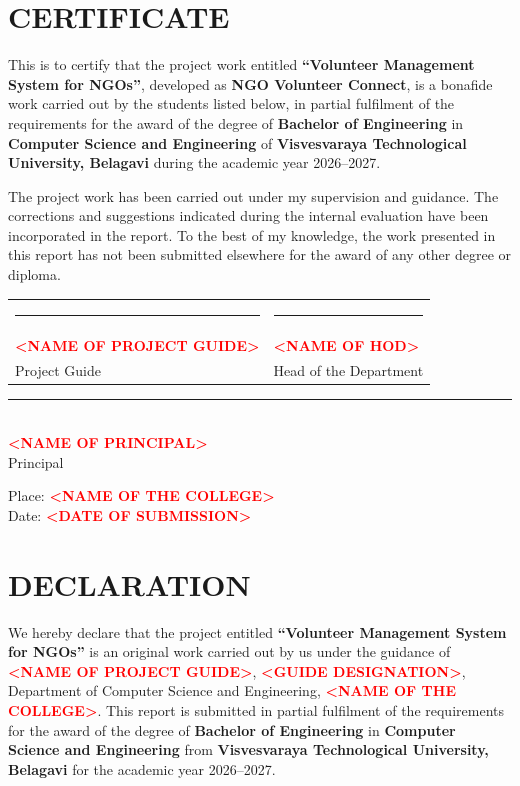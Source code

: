 \documentclass[12pt,a4paper,oneside]{report}
\newcommand{\projecttitle}{Volunteer Management System for NGOs}
\newcommand{\applicationname}{NGO Volunteer Connect}
\newcommand{\college}{\placeholder{NAME OF THE COLLEGE}}
\newcommand{\department}{Department of Computer Science and Engineering}
\newcommand{\university}{Visvesvaraya Technological University, Belagavi}
\newcommand{\academicyear}{2026--2027}
\newcommand{\degree}{Bachelor of Engineering}
\newcommand{\branch}{Computer Science and Engineering}
\newcommand{\guide}{\placeholder{NAME OF PROJECT GUIDE}}
\newcommand{\guideDesignation}{\placeholder{GUIDE DESIGNATION}}
\newcommand{\hod}{\placeholder{NAME OF HOD}}
\newcommand{\principal}{\placeholder{NAME OF PRINCIPAL}}
\newcommand{\placeholder}[1]{\textbf{\textcolor{red}{\textless #1\textgreater}}}
\begin{document}
\chapter*{CERTIFICATE}

This is to certify that the project work entitled \textbf{``\projecttitle''}, developed as \textbf{\applicationname}, is a bonafide work carried out by the students listed below, in partial fulfilment of the requirements for the award of the degree of \textbf{\degree} in \textbf{\branch} of \textbf{\university} during the academic year \academicyear.

The project work has been carried out under my supervision and guidance. The corrections and suggestions indicated during the internal evaluation have been incorporated in the report. To the best of my knowledge, the work presented in this report has not been submitted elsewhere for the award of any other degree or diploma.

\vspace{1.0in}
\noindent
\begin{tabularx}{\textwidth}{X X}
\centering \rule{2.2in}{0.4pt} & \centering \rule{2.2in}{0.4pt}\\
\centering \guide & \centering \hod\\
\centering Project Guide & \centering Head of the Department
\end{tabularx}

\vspace{0.8in}
\begin{center}
\rule{2.5in}{0.4pt}\\
\principal\\
Principal
\end{center}

\vfill
\noindent Place: \college\\
Date: \placeholder{DATE OF SUBMISSION}

\clearpage

\chapter*{DECLARATION}

We hereby declare that the project entitled \textbf{``\projecttitle''} is an original work carried out by us under the guidance of \textbf{\guide}, \guideDesignation, \department, \college. This report is submitted in partial fulfilment of the requirements for the award of the degree of \textbf{\degree} in \textbf{\branch} from \textbf{\university} for the academic year \academicyear.
\end{document}
